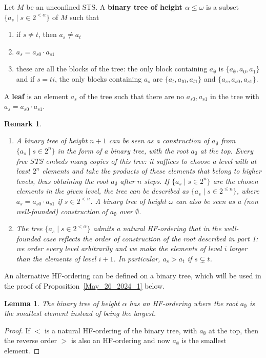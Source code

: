 \documentclass[a4paper, 11pt]{article}
\theoremstyle{note}
\newtheorem{lemma}[thm]{Lemma}
\newtheorem{rmk}[thm]{Remark}
\begin{document}
Let $M$ be an unconfined STS. A  \textbf{binary  tree of height $\alpha\leq \omega$} is a subset  $\{a_s\mid s\in 2^{<\alpha}\}$ of $M$ such that
\begin{enumerate}
	\item if $s\neq t$, then $a_s\neq a_t$
	\item $a_s= a_{s0}\cdot a_{s1}$
	\item these are all the blocks of the tree:  the only block containing $a_\emptyset$ is $\{a_\emptyset, a_0, a_1\}$  and if $s=ti$,  the only blocks containing $a_s$  are   $\{a_t,a_{t0},a_{t1}\}$  and  $\{a_s,a_{s0},a_{s1}\}$.   
\end{enumerate}
A \textbf{leaf} is an element $a_s$ of the tree such that there are no $a_{s0}, a_{s1}$ in the tree with $a_s=a_{s0}\cdot a_{s1}$.

\begin{rmk}\begin{enumerate}\label{tree1}
		\item A binary tree of height $n+1$ can be seen as a construction of $a_\emptyset$ from $\{a_s\mid s\in 2^n\}$ in the form of a binary tree, with the root $a_\emptyset$ at the top. Every free STS embeds many copies of this tree: it suffices to choose a level with at least  $2^n$ elements and take the products of these elements that belong to higher levels, thus obtaining the root $a_\emptyset$ after $n$ steps. If $\{a_s\mid s\in 2^n\}$ are the chosen elements in the given level, the tree can be described as $\{a_s\mid s\in 2^{\leq n}\}$, where  $a_s= a_{s0}\cdot a_{s1}$ if  $s\in 2^{<n}$.   A binary tree of height $\omega$  can also be seen as a (non well-founded) construction of $a_\emptyset$ over $\emptyset$. 
		\item The tree $\{a_s\mid s\in 2^{<\alpha}\}$  admits a  natural HF-ordering  that in the well-founded case reflects the order of construction of the root described in part 1: we order every level arbitrarily and we make the elements of level $i$  larger than the elements of level $i+1$. In particular, $a_s > a_t$  if $s\subsetneq t$.
	\end{enumerate}
\end{rmk}
An alternative HF-ordering can be defined on a binary tree, which will be used in the proof of Proposition~\ref{May_26_2024_1} below.
\begin{lemma}\label{April_11_2024_2} The binary tree of height $\alpha$ has an HF-ordering where the root  $a_\emptyset$ is the smallest element instead of being the largest.
\end{lemma}
\begin{proof}  If $<$ is  a natural HF-ordering of the binary tree, with $a_\emptyset$ at the top, then the reverse order $>$ is also an HF-ordering and now $a_\emptyset$ is the smallest element.
\end{proof}
\end{document}
